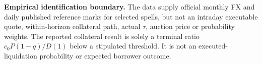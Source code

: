 \documentclass[10pt,a4paper]{article}
\begin{document}
\medskip
\noindent\textbf{Empirical identification boundary.} The data supply official monthly FX and daily published reference marks for selected spells, but not an intraday executable quote, within-horizon collateral path, actual $\tau$, auction price or probability weights. The reported collateral result is solely a terminal ratio $c_0P(1-q)/D(1)$ below a stipulated threshold. It is not an executed-liquidation probability or expected borrower outcome.
\end{document}

